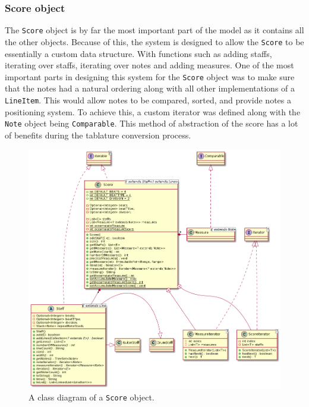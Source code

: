\documentclass[11pt]{article}
\begin{document}
\subsubsection{Score object}
\label{sec:org01f19d6}
The \texttt{Score} object is by far the most important part of the model as it contains all the other objects. Because of this, the system is designed to allow the \texttt{Score} to be essentially a custom data structure. With functions such as adding staffs, iterating over staffs, iterating over notes and adding measures. One of the most important parts in designing this system for the \texttt{Score} object was to make sure that the notes had a natural ordering along with all other implementations of a \texttt{LineItem}. This would allow notes to be compared, sorted, and provide notes a positioning system. To achieve this, a custom iterator was defined along with the \texttt{Note} object being \texttt{Comparable}. This method of abstraction of the score has a lot of benefits during the tablature conversion process.
\begin{figure}[htbp]
\centering
\includegraphics[width=.9\linewidth]{./Diagrams/backend-score-diagram.png}
\caption{A class diagram of a \texttt{Score} object.}
\end{figure}

\newpage
\end{document}
